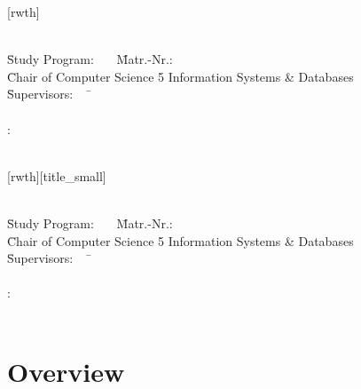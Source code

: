 \documentclass[aspectratio=169]{beamer}
\author[\firstname]{\firstname~\lastname~\email}
\institute[RWTH]{RWTH Aachen University}
\begin{document}
[rwth]{}
\begin{frame}[plain]
\titlepage

\parbox{0cm}{
  \vspace{-5.5em}
  \begin{tabbing}
    \=\textbf{\firstname~\lastname}\=\\[0.5em]
    \=Study Program: \studyProgram~~~\=Matr.-Nr.:\matrNo\\[0.5em]
    \=Chair of Computer Science 5 Information Systems \& Databases \=\\[0.5em]
    \={Supervisors}:~~~\=\firstsupervisor\\
    \>                 \>\secondsupervisor\\[0.5em]
    :       \>\firstadvisor\ifdefined\secondadvisor\\
    \>                 \>\secondadvisor\\[0.5em]
    \fi
  \end{tabbing}
}
\end{frame}

[rwth][title_small]{}
\begin{frame}[plain]
\vspace{1cm}
\titlepage

\vspace{-6em}
\parbox{0cm}{
  \begin{tabbing}
    \=\textbf{\firstname~\lastname}\=\\[0.4em]
    \=Study Program: \studyProgram~~~\=Matr.-Nr.:\matrNo\\[0.4em]
    \=Chair of Computer Science 5 Information Systems \& Databases \=\\[0.4em]
    \={Supervisors}:~~~\=\firstsupervisor\\
    \>                 \>\secondsupervisor\\[0.4em]
    :       \>\firstadvisor\ifdefined\secondadvisor\\
    \>                 \>\secondadvisor\\[0.4em]
    \fi
  \end{tabbing}
}
\end{frame}

\section*{Overview}
\begin{frame}
  \tableofcontents %
\end{frame}
\end{document}

